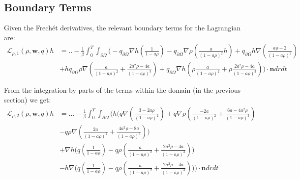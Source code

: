 \documentclass[11pt, a4paper]{article}
\theoremstyle{definition}
\newcommand{\w}{\mathbf{w}}
\newcommand{\n}{\mathbf{n}}
\begin{document}
\subsection{Boundary Terms}
Given the Frech\'et derivatives, the relevant boundary terms for the Lagrangian are:
\begin{align*}
	\mathcal{L}_{\rho,1}(\rho,\w, q) h &=.. - \frac{1}{\beta}\int_0^T \int_{\partial \Omega} \bigg(- q_{\partial \Omega}\nabla h \left(\frac{1}{1 - a\rho}\right) - q_{\partial \Omega}\nabla \rho \left( \frac{a}{(1 -a \rho)^2}h \right)+ q_{\partial \Omega}h \nabla \left(\frac{a \rho  - 2}{(1- a \rho)^2}\right) \\
	&+ h q_{\partial \Omega}\rho \nabla \left( \frac{a}{(1- a \rho)^2} + \frac{2a^2\rho - 4a}{(1- a \rho)^3} \right) + q_{\partial \Omega}\nabla h \left( \rho \frac{a}{(1- a \rho)^2} + \rho\frac{2a^2\rho - 4a}{(1- a \rho)^3} \right) \bigg) \cdot \n dr dt
\end{align*}

From the integration by parts of the terms within the domain (in the previous section) we get:
\begin{align*}
	\mathcal{L}_{\rho,2}(\rho, \w,q)h &=... - \frac{1}{\beta}\int_0^T \int_{\partial \Omega} \bigg(h \bigg( q  \nabla \left( \frac{3-2a\rho}{(1-a\rho)^2} \right) + q \nabla \rho  \left( \frac{-2a }{(1-a\rho)^2} + \frac{6a-4a^2  \rho}{(1-a\rho)^3}  \right)\\
	&- q\rho \nabla \left(\frac{2a }{(1-a\rho)^2} + \frac{4a^2\rho -8a}{(1-a\rho)^3} \right) \bigg)\\
	& + \nabla h \bigg(q \left(\frac{1}{1- a\rho} \right)  - q\rho  \left(\frac{a }{(1-a\rho)^2} + \frac{2a^2\rho -4a}{(1-a\rho)^3} \right)  \bigg) \\
	&- h \nabla \bigg(q \left(\frac{1}{1- a\rho} \right)  - q\rho  \left(\frac{a }{(1-a\rho)^2} + \frac{2a^2\rho -4a}{(1-a\rho)^3} \right)  \bigg) \bigg)\cdot \n dr dt
\end{align*}
\end{document}
